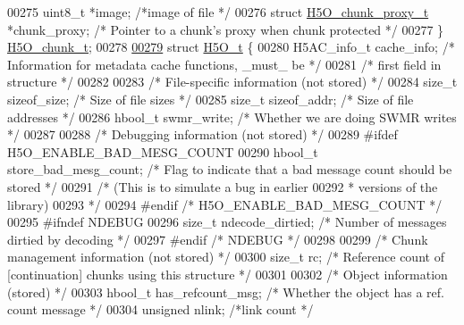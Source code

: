 \begin{DoxyCode}
00275     uint8\_t *image;         \textcolor{comment}{/*image of file              */}
00276     \textcolor{keyword}{struct }\hyperlink{struct_h5_o__chunk__proxy__t}{H5O\_chunk\_proxy\_t} *chunk\_proxy;    \textcolor{comment}{/* Pointer to a chunk's proxy when chunk
       protected */}
00277 \} \hyperlink{struct_h5_o__chunk__t}{H5O\_chunk\_t};
00278 
\hyperlink{struct_h5_o__t}{00279} \textcolor{keyword}{struct }\hyperlink{struct_h5_o__t}{H5O\_t} \{
00280     H5AC\_info\_t cache\_info; \textcolor{comment}{/* Information for metadata cache functions, \_must\_ be */}
00281                             \textcolor{comment}{/* first field in structure */}
00282 
00283     \textcolor{comment}{/* File-specific information (not stored) */}
00284     \textcolor{keywordtype}{size\_t}      sizeof\_size;            \textcolor{comment}{/* Size of file sizes            */}
00285     \textcolor{keywordtype}{size\_t}      sizeof\_addr;            \textcolor{comment}{/* Size of file addresses        */}
00286     hbool\_t     swmr\_write;             \textcolor{comment}{/* Whether we are doing SWMR writes  */}
00287 
00288     \textcolor{comment}{/* Debugging information (not stored) */}
00289 \textcolor{preprocessor}{#ifdef H5O\_ENABLE\_BAD\_MESG\_COUNT}
00290     hbool\_t     store\_bad\_mesg\_count;   \textcolor{comment}{/* Flag to indicate that a bad message count should be stored */}
00291                                         \textcolor{comment}{/* (This is to simulate a bug in earlier}
00292 \textcolor{comment}{                                         *      versions of the library)}
00293 \textcolor{comment}{                                         */}
00294 \textcolor{preprocessor}{#endif }\textcolor{comment}{/* H5O\_ENABLE\_BAD\_MESG\_COUNT */}\textcolor{preprocessor}{}
00295 \textcolor{preprocessor}{#ifndef NDEBUG}
00296     \textcolor{keywordtype}{size\_t}      ndecode\_dirtied;        \textcolor{comment}{/* Number of messages dirtied by decoding */}
00297 \textcolor{preprocessor}{#endif }\textcolor{comment}{/* NDEBUG */}\textcolor{preprocessor}{}
00298 
00299     \textcolor{comment}{/* Chunk management information (not stored) */}
00300     \textcolor{keywordtype}{size\_t}      rc;                     \textcolor{comment}{/* Reference count of [continuation] chunks using this structure */}
00301 
00302     \textcolor{comment}{/* Object information (stored) */}
00303     hbool\_t     has\_refcount\_msg;       \textcolor{comment}{/* Whether the object has a ref. count message */}
00304     \textcolor{keywordtype}{unsigned}    nlink;          \textcolor{comment}{/*link count                 */}

\end{DoxyCode}
